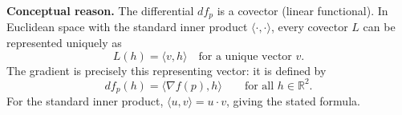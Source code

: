 \documentclass[12pt,a4paper]{article}
\theoremstyle{plain}
\theoremstyle{definition}      %
\begin{document}
	\medskip
	\noindent\textbf{Conceptual reason.}
	The differential $df_p$ is a covector (linear functional). In Euclidean space with the standard inner product
	$\langle\cdot,\cdot\rangle$, every covector $L$ can be represented uniquely as
	\[
	L(h)=\langle v,h\rangle
	\quad\text{for a unique vector }v.
	\]
	The gradient is precisely this representing vector: it is defined by
	\[
	df_p(h)=\langle \nabla f(p),h\rangle\qquad\text{for all }h\in\mathbb{R}^2.
	\]
	For the standard inner product, $\langle u,v\rangle=u\cdot v$, giving the stated formula.
	
	
	
\end{document}

